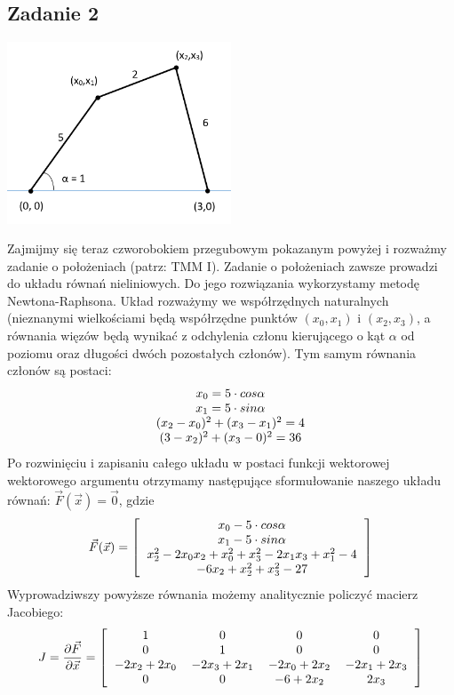 \documentclass{instrukcja}
\begin{document}
\subsection*{Zadanie 2}

\includegraphics[width=0.5\textwidth]{czworobok.png}

Zajmijmy się teraz czworobokiem przegubowym pokazanym powyżej i rozważmy zadanie o położeniach (patrz: TMM I). Zadanie o położeniach zawsze prowadzi do układu równań nieliniowych. Do jego rozwiązania wykorzystamy metodę Newtona-Raphsona. Układ rozważymy we współrzędnych naturalnych (nieznanymi wielkościami będą współrzędne punktów $(x_0,x_1)$ i $(x_2,x_3)$, a równania więzów będą wynikać z odchylenia członu kierującego o kąt $\alpha$ od poziomu oraz długości dwóch pozostałych członów). Tym samym równania członów są postaci:
\begin{displaymath}
\begin{tabular}{c}
$x_0 = 5 \cdot cos\alpha$ \\
$x_1 = 5 \cdot sin \alpha$ \\
$(x_2-x_0)^2 + (x_3-x_1)^2 = 4$ \\
$(3-x_2)^2 + (x_3-0)^2 = 36$
\end{tabular}
\end{displaymath}
Po rozwinięciu i zapisaniu całego układu w postaci funkcji wektorowej wektorowego argumentu otrzymamy następujące sformułowanie naszego układu równań: $\vec F(\vec x) = \vec 0$, gdzie
\begin{displaymath}
\vec F(\vec x) = \left[ \begin{tabular}{c} $x_0 - 5 \cdot cos\alpha$ \\
$x_1 - 5 \cdot sin \alpha$ \\
$x_2^2-2x_0 x_2 + x_0^2 + x_3^2-2x_1 x_3 +x_1^2 -4 $ \\
$-6x_2+x_2^2+x_3^2-27$
\end{tabular} \right]
\end{displaymath}
Wyprowadziwszy powyższe równania możemy analitycznie policzyć macierz Jacobiego:
\begin{displaymath}
J = \frac{\partial \vec F}{\partial \vec x} = 
\left[ \begin{tabular}{c c c c}
1 & 0 & 0 & 0 \\
0 & 1 & 0 & 0 \\
$-2x_2+2x_0$ & $-2x_3+2x_1$ & $-2x_0+2x_2$ & $-2x_1+2x_3$ \\
0 & 0 & $-6+2x_2$ & $2x_3$ \\
\end{tabular}
\right]
\end{displaymath}
\end{document}
